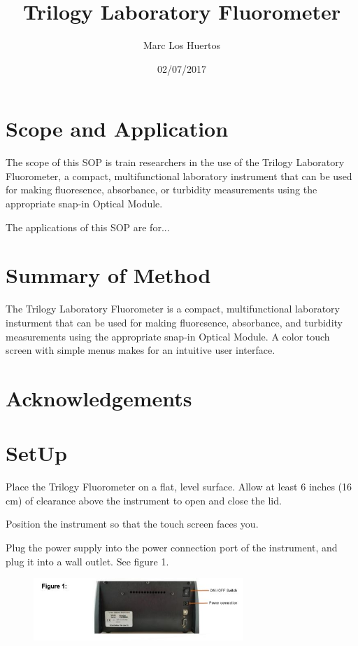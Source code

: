 \documentclass[12pt]{../SOP3_beta}
\title{Trilogy Laboratory Fluorometer}
\date{02/07/2017}
\author{Marc Los Huertos}
\begin{document}


\maketitle

\section{Scope and Application}

\NP The scope of this SOP is train researchers in the use of the Trilogy Laboratory Fluorometer, a compact, multifunctional laboratory instrument that can be used for making fluoresence, absorbance, or turbidity measurements using the appropriate snap-in Optical Module. 

\NP The applications of this SOP are for...

\section{Summary of Method}

\NP The Trilogy Laboratory Fluorometer is a compact, multifunctional laboratory insturment that can be used for making fluoresence, absorbance, and turbidity measurements using the appropriate snap-in Optical Module. A color touch screen with simple menus makes for an intuitive user interface. 

\tableofcontents

\newpage

\section{Acknowledgements}

\section{SetUp}

\NP Place the Trilogy Fluorometer on a flat, level surface.  Allow at least 6 inches (16 cm) of clearance above the instrument to open and close the lid. 

\NP Position the instrument so that the touch screen faces you.  

\NP Plug the power supply into the power connection port of the instrument, and plug it into a wall outlet. See figure 1.


\NP \begin{figure}
\includegraphics[width=300]{"Capture.JPG"}
\end{figure}
\end{document}
